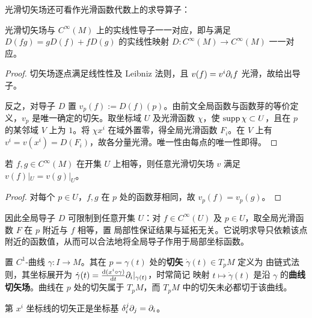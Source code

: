 光滑切矢场还可看作光滑函数代数上的求导算子：

\begin{theorem}
    光滑切矢场与 $C^\infty(M)$ 上的实线性导子一一对应，即与满足 $D(fg)=gD(f)+fD(g)$ 的实线性映射 $D:C^\infty(M)\to C^\infty(M)$ 一一对应。
\end{theorem}
\begin{proof}
    切矢场逐点满足线性性及 Leibniz 法则，且 $v(f)=v^i\partial_i f$ 光滑，故给出导子。

    反之，对导子 $D$ 置 $v_p(f):=D(f)(p)$。由前文全局函数与函数芽的等价定义，$v_p$ 是唯一确定的切矢。取坐标域 $U$ 及光滑函数 $\chi$，使 $\operatorname{supp}\chi\subset U$，且在 $p$ 的某邻域 $V$ 上为 $1$。将 $\chi x^i$ 在域外置零，得全局光滑函数 $F_i$。在 $V$ 上有 $v^i=v(x^i)=D(F_i)$，故各分量光滑。唯一性由每点的唯一性即得。
\end{proof}

\begin{proposition}[局部性]
    若 $f,g\in C^\infty(M)$ 在开集 $U$ 上相等，则任意光滑切矢场 $v$ 满足 $v(f)|_U=v(g)|_U$。
\end{proposition}
\begin{proof}
    对每个 $p\in U$，$f,g$ 在 $p$ 处的函数芽相同，故 $v_p(f)=v_p(g)$。
\end{proof}

\begin{remark}
    因此全局导子 $D$ 可限制到任意开集 $U$：对 $f\in C^\infty(U)$ 及 $p\in U$，取全局光滑函数 $F$ 在 $p$ 附近与 $f$ 相等，置
    局部性保证结果与延拓无关。它说明求导只依赖该点附近的函数值，从而可以合法地将全局导子作用于局部坐标函数。
\end{remark}

\begin{definition}
    置 $C^1$-曲线 $\gamma:I\to M$。其在 $p=\gamma(t)$ 处的\textbf{切矢} $\dot\gamma(t)\in T_pM$ 定义为
    由链式法则，其坐标展开为 $\dot\gamma(t)=\dv{(x^i\circ\gamma)}{t}\partial_i|_{\gamma(t)}$，时常简记 
    映射 $t\mapsto\dot\gamma(t)$ 是沿 $\gamma$ 的\textbf{曲线切矢场}。曲线在 $p$ 处的切矢属于 $T_pM$，而 $T_pM$ 中的切矢未必都切于该曲线。
\end{definition}

\begin{example}
    第 $x^i$ 坐标线的切矢正是坐标基 $\delta^j_i\partial_j=\partial_i$。
\end{example}



